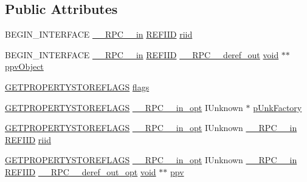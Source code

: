 \subsection*{Public Attributes}
\begin{DoxyCompactItemize}
\item 
B\+E\+G\+I\+N\+\_\+\+I\+N\+T\+E\+R\+F\+A\+CE \hyperlink{rpcsal_8h_a20b7f6da600a05c8b541659f14f7f0e6}{\+\_\+\+\_\+\+R\+P\+C\+\_\+\+\_\+in} \hyperlink{px__win__ds_8c_a80ec49c8ae61e234197d5071d2df497d}{R\+E\+F\+I\+ID} \hyperlink{struct_i_property_store_factory_vtbl_af8f6e7659c1fbc799ee82830f6b8250b}{riid}
\item 
B\+E\+G\+I\+N\+\_\+\+I\+N\+T\+E\+R\+F\+A\+CE \hyperlink{rpcsal_8h_a20b7f6da600a05c8b541659f14f7f0e6}{\+\_\+\+\_\+\+R\+P\+C\+\_\+\+\_\+in} \hyperlink{px__win__ds_8c_a80ec49c8ae61e234197d5071d2df497d}{R\+E\+F\+I\+ID} \hyperlink{rpcsal_8h_a23bc188526f10656f9c79d950f6c3192}{\+\_\+\+\_\+\+R\+P\+C\+\_\+\+\_\+deref\+\_\+out} \hyperlink{sound_8c_ae35f5844602719cf66324f4de2a658b3}{void} $\ast$$\ast$ \hyperlink{struct_i_property_store_factory_vtbl_af55565032f3fb2f5f1445eaf72f4ab18}{ppv\+Object}
\item 
\hyperlink{propsys_8h_a9db84a5b338e0b1423020b4294cef38b}{G\+E\+T\+P\+R\+O\+P\+E\+R\+T\+Y\+S\+T\+O\+R\+E\+F\+L\+A\+GS} \hyperlink{struct_i_property_store_factory_vtbl_a7da64db4ae405aeb538fc2545d49a196}{flags}
\item 
\hyperlink{propsys_8h_a9db84a5b338e0b1423020b4294cef38b}{G\+E\+T\+P\+R\+O\+P\+E\+R\+T\+Y\+S\+T\+O\+R\+E\+F\+L\+A\+GS} \hyperlink{rpcsal_8h_a6e152ac84637d70f0453366759b3b9fb}{\+\_\+\+\_\+\+R\+P\+C\+\_\+\+\_\+in\+\_\+opt} I\+Unknown $\ast$ \hyperlink{struct_i_property_store_factory_vtbl_a1021fc2258cb3e95b1e29b80da0b0ad7}{p\+Unk\+Factory}
\item 
\hyperlink{propsys_8h_a9db84a5b338e0b1423020b4294cef38b}{G\+E\+T\+P\+R\+O\+P\+E\+R\+T\+Y\+S\+T\+O\+R\+E\+F\+L\+A\+GS} \hyperlink{rpcsal_8h_a6e152ac84637d70f0453366759b3b9fb}{\+\_\+\+\_\+\+R\+P\+C\+\_\+\+\_\+in\+\_\+opt} I\+Unknown \hyperlink{rpcsal_8h_a20b7f6da600a05c8b541659f14f7f0e6}{\+\_\+\+\_\+\+R\+P\+C\+\_\+\+\_\+in} \hyperlink{px__win__ds_8c_a80ec49c8ae61e234197d5071d2df497d}{R\+E\+F\+I\+ID} \hyperlink{struct_i_property_store_factory_vtbl_a3f09fdb9a6ae5f71e5cfe2f1948ba2c5}{riid}
\item 
\hyperlink{propsys_8h_a9db84a5b338e0b1423020b4294cef38b}{G\+E\+T\+P\+R\+O\+P\+E\+R\+T\+Y\+S\+T\+O\+R\+E\+F\+L\+A\+GS} \hyperlink{rpcsal_8h_a6e152ac84637d70f0453366759b3b9fb}{\+\_\+\+\_\+\+R\+P\+C\+\_\+\+\_\+in\+\_\+opt} I\+Unknown \hyperlink{rpcsal_8h_a20b7f6da600a05c8b541659f14f7f0e6}{\+\_\+\+\_\+\+R\+P\+C\+\_\+\+\_\+in} \hyperlink{px__win__ds_8c_a80ec49c8ae61e234197d5071d2df497d}{R\+E\+F\+I\+ID} \hyperlink{rpcsal_8h_ab29e89ceb0eb0b075c6f6299b0de6a21}{\+\_\+\+\_\+\+R\+P\+C\+\_\+\+\_\+deref\+\_\+out\+\_\+opt} \hyperlink{sound_8c_ae35f5844602719cf66324f4de2a658b3}{void} $\ast$$\ast$ \hyperlink{struct_i_property_store_factory_vtbl_a91a9e9534a0626d6c9d7780e0f95e639}{ppv}

\end{DoxyCompactItemize}
